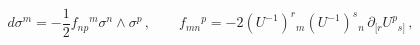 \begin{equation}
  d\sigma^{m} =-{\textstyle\frac{1}{2}}
  f_{np}{}^{m}\sigma^{n}\wedge \sigma^{p} \,, \qquad
  f_{mn}{}^{p} = -2(U^{-1})^{r}{}_{m} (U^{-1})^{s}{}_{n}\, 
 \partial_{[r} U^{p}{}_{s]}\, ,
\label{MC}
\end{equation}

